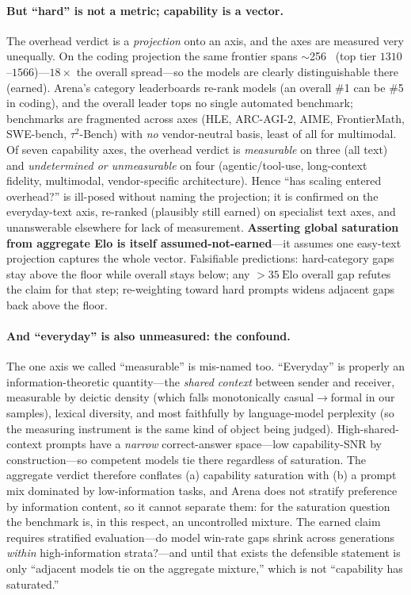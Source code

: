 \documentclass[11pt]{article}
\newcommand{\elo}{\mathrm{Elo}}
\begin{document}
\paragraph{But ``hard'' is not a metric; capability is a vector.} The overhead
verdict is a \emph{projection} onto an axis, and the axes are measured very
unequally. On the coding projection the same frontier spans $\sim$256~\elo
(top tier $1310$--$1566$)---$18\times$ the overall spread---so the models are
clearly distinguishable there (earned). Arena's category leaderboards re-rank
models (an overall \#1 can be \#5 in coding), and the overall leader tops no single
automated benchmark; benchmarks are fragmented across axes (HLE, ARC-AGI-2, AIME,
FrontierMath, SWE-bench, $\tau^2$-Bench) with \emph{no} vendor-neutral basis, least
of all for multimodal. Of seven capability axes, the overhead verdict is
\emph{measurable} on three (all text) and \emph{undetermined or unmeasurable} on
four (agentic/tool-use, long-context fidelity, multimodal, vendor-specific
architecture). Hence ``has scaling entered overhead?'' is ill-posed without naming
the projection; it is confirmed on the everyday-text axis, re-ranked (plausibly
still earned) on specialist text axes, and unanswerable elsewhere for lack of
measurement. \textbf{Asserting global saturation from aggregate Elo is itself
assumed-not-earned}---it assumes one easy-text projection captures the whole
vector. Falsifiable predictions: hard-category gaps stay above the floor while
overall stays below; any $>35~\elo$ overall gap refutes the claim for that step;
re-weighting toward hard prompts widens adjacent gaps back above the floor.

\paragraph{And ``everyday'' is also unmeasured: the confound.} The one axis we
called ``measurable'' is mis-named too. ``Everyday'' is properly an
information-theoretic quantity---the \emph{shared context} between sender and
receiver, measurable by deictic density (which falls monotonically casual$\to$formal
in our samples), lexical diversity, and most faithfully by language-model
perplexity (so the measuring instrument is the same kind of object being judged).
High-shared-context prompts have a \emph{narrow} correct-answer space---low
capability-SNR by construction---so competent models tie there regardless of
saturation. The aggregate verdict therefore conflates (a) capability saturation
with (b) a prompt mix dominated by low-information tasks, and Arena does not
stratify preference by information content, so it cannot separate them: for the
saturation question the benchmark is, in this respect, an uncontrolled mixture. The
earned claim requires stratified evaluation---do model win-rate gaps shrink across
generations \emph{within} high-information strata?---and until that exists the
defensible statement is only ``adjacent models tie on the aggregate mixture,'' which
is not ``capability has saturated.''
\end{document}
